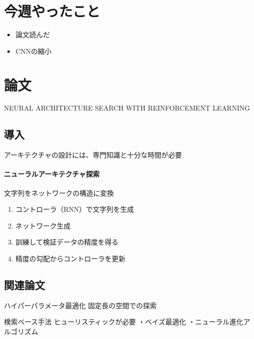 \documentclass[twocolumn]{jarticle}     %
\begin{document}


\section{今週やったこと}
\begin{itemize}
	\item {論文読んだ}
	\item {CNNの縮小}
\end{itemize}

\section{論文}
NEURAL ARCHITECTURE SEARCH WITH REINFORCEMENT LEARNING
\subsection{導入}
アーキテクチャの設計には、専門知識と十分な時間が必要

\paragraph{ニューラルアーキテクチャ探索}
文字列をネットワークの構造に変換
\begin{enumerate}
  \item コントローラ（RNN）で文字列を生成
  \item ネットワーク生成
  \item 訓練して検証データの精度を得る
  \item 精度の勾配からコントローラを更新
\end{enumerate}

\subsection{関連論文}
ハイパーパラメータ最適化
固定長の空間での探索

検索ベース手法
ヒューリスティックが必要
・ベイズ最適化
・ニューラル進化アルゴリズム
\end{document}

